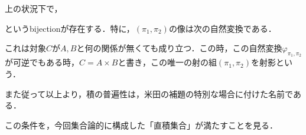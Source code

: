 \documentclass[uplatex,dvipdfmx]{jsreport}
\begin{document}
\begin{remark}
    上の状況下で，
    \begin{center}\end{center}
    というbijectionが存在する．特に，$(\pi_1,\pi_2)$の像は次の自然変換である．
    \begin{center}\end{center}
    これは対象$C$が$A,B$と何の関係が無くても成り立つ．この時，この自然変換$\varphi_{\pi_1,\pi_2}$が可逆でもある時，$C=A\times B$と書き，この唯一の射の組$(\pi_1,\pi_2)$を射影という．

    また従って以上より，積の普遍性は，米田の補題の特別な場合に付けた名前である．
\end{remark}

この条件を，今回集合論的に構成した「直積集合」が満たすことを見る．
\end{document}
